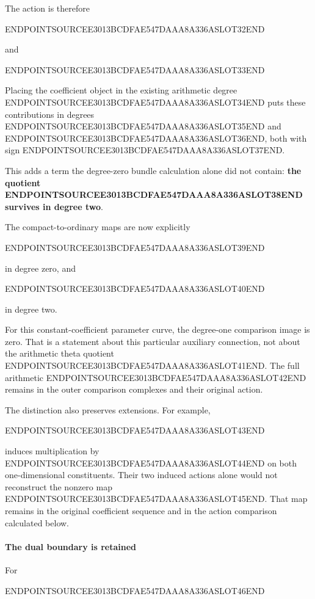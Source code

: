 The action is therefore

ENDPOINTSOURCEE3013BCDFAE547DAAA8A336ASLOT32END

and

ENDPOINTSOURCEE3013BCDFAE547DAAA8A336ASLOT33END

Placing the coefficient object in the existing arithmetic degree ENDPOINTSOURCEE3013BCDFAE547DAAA8A336ASLOT34END puts these contributions in degrees ENDPOINTSOURCEE3013BCDFAE547DAAA8A336ASLOT35END and ENDPOINTSOURCEE3013BCDFAE547DAAA8A336ASLOT36END, both with sign ENDPOINTSOURCEE3013BCDFAE547DAAA8A336ASLOT37END.

This adds a term the degree-zero bundle calculation alone did not contain: \textbf{the quotient ENDPOINTSOURCEE3013BCDFAE547DAAA8A336ASLOT38END survives in degree two}.

The compact-to-ordinary maps are now explicitly

ENDPOINTSOURCEE3013BCDFAE547DAAA8A336ASLOT39END

in degree zero, and

ENDPOINTSOURCEE3013BCDFAE547DAAA8A336ASLOT40END

in degree two.

For this constant-coefficient parameter curve, the degree-one comparison image is zero. That is a statement about this particular auxiliary connection, not about the arithmetic theta quotient ENDPOINTSOURCEE3013BCDFAE547DAAA8A336ASLOT41END. The full arithmetic ENDPOINTSOURCEE3013BCDFAE547DAAA8A336ASLOT42END remains in the outer comparison complexes and their original action.

The distinction also preserves extensions. For example,

ENDPOINTSOURCEE3013BCDFAE547DAAA8A336ASLOT43END

induces multiplication by ENDPOINTSOURCEE3013BCDFAE547DAAA8A336ASLOT44END on both one-dimensional constituents. Their two induced actions alone would not reconstruct the nonzero map ENDPOINTSOURCEE3013BCDFAE547DAAA8A336ASLOT45END. That map remains in the original coefficient sequence and in the action comparison calculated below.

\paragraph{The dual boundary is retained}\label{endpoint-exponential_constituent_original--the-dual-boundary-is-retained}

For

ENDPOINTSOURCEE3013BCDFAE547DAAA8A336ASLOT46END

